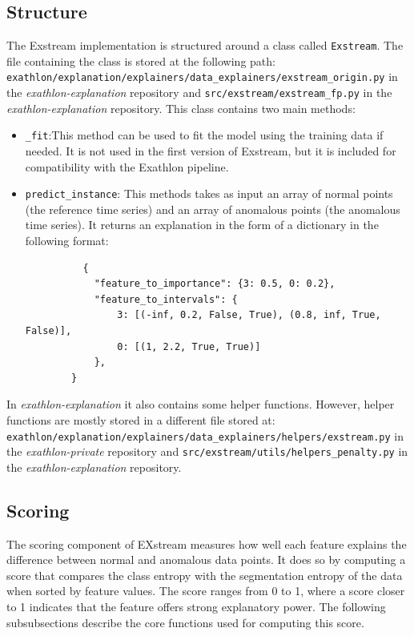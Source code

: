 \documentclass[11pt]{article}
\begin{document}
\subsection{Structure}
The Exstream implementation is structured around a class called \texttt{Exstream}. The file containing the class is stored at the following path:\\
 \texttt{exathlon/explanation/explainers/data\_explainers/exstream\_origin.py} in the \textit{exathlon-explanation} repository and \texttt{src/exstream/exstream\_fp.py} in the \textit{exathlon-explanation} repository.
 This class contains two main methods:
\begin{itemize}
  \item \texttt{\_fit}:This method can be used to fit the model using the training data if needed. It is not used in the first version of Exstream, but it is included for compatibility with the Exathlon pipeline.
  \item \texttt{predict\_instance}: This methods takes as input an array of normal points (the reference time series) and an array of anomalous points (the anomalous time series). It returns an explanation in the form of a dictionary in the following format:
\begin{verbatim}
          {
            "feature_to_importance": {3: 0.5, 0: 0.2},
            "feature_to_intervals": {
                3: [(-inf, 0.2, False, True), (0.8, inf, True, False)],
                0: [(1, 2.2, True, True)]
            },
        }
\end{verbatim}
\end{itemize} 
In \textit{exathlon-explanation} it also contains some helper functions. However, helper functions are mostly stored in a different file stored at: \\
\texttt{exathlon/explanation/explainers/data\_explainers/helpers/exstream.py} in the \textit{exathlon-private} repository and \texttt{src/exstream/utils/helpers\_penalty.py} in the \textit{exathlon-explanation} repository.\\



\subsection{Scoring}
The scoring component of EXstream measures how well each feature explains the difference between normal and anomalous data points. It does so by computing a score that compares the class entropy with the segmentation entropy of the data when sorted by feature values. The score ranges from 0 to 1, where a score closer to 1 indicates that the feature offers strong explanatory power. The following subsubsections describe the core functions used for computing this score.
\end{document}
